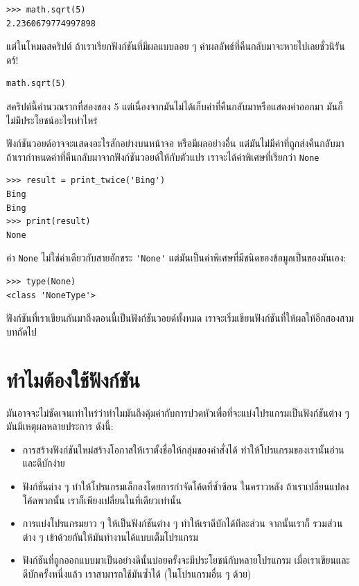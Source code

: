 \begin{verbatim}
>>> math.sqrt(5)
2.2360679774997898
\end{verbatim}
%
แต่ในโหมดสคริปต์ ถ้าเราเรียกฟังก์ชันที่มีผลแบบลอย ๆ ค่าผลลัพธ์ที่คืนกลับมาจะหายไปเลยชั่วนิรันดร์!

\begin{verbatim}
math.sqrt(5)
\end{verbatim}
% 
สคริปต์นี้คำนวณรากที่สองของ 5 แต่เนื่องจากมันไม่ได้เก็บค่าที่คืนกลับมาหรือแสดงค่าออกมา มันก็ไม่มีประโยชน์อะไรเท่าไหร่

ฟังก์ชันวอยด์อาจจะแสดงอะไรสักอย่างบนหน้าจอ หรือมีผลอย่างอื่น แต่มันไม่มีค่าที่ถูกส่งคืนกลับมา
ถ้าเรากำหนดค่าที่คืนกลับมาจากฟังก์ชันวอยด์ให้กับตัวแปร เราจะได้ค่าพิเศษที่เรียกว่า {\tt None}

\begin{verbatim}
>>> result = print_twice('Bing')
Bing
Bing
>>> print(result)
None
\end{verbatim}
%
ค่า {\tt None} ไม่ใช่ค่าเดียวกับสายอักขระ \verb"'None'" แต่มันเป็นค่าพิเศษที่มีชนิดของข้อมูลเป็นของมันเอง:

\begin{verbatim}
>>> type(None)
<class 'NoneType'>
\end{verbatim}
%
ฟังก์ชันที่เราเขียนกันมาถึงตอนนี้เป็นฟังก์ชันวอยด์ทั้งหมด เราจะเริ่มเขียนฟังก์ชันที่ให้ผลให้อีกสองสามบทถัดไป


\section{ทำไมต้องใช้ฟังก์ชัน} %

มันอาจจะไม่ชัดเจนเท่าไหร่ว่าทำไมมันถึงคุ้มค่ากับการปวดหัวเพื่อที่จะแบ่งโปรแกรมเป็นฟังก์ชันต่าง ๆ
มันมีเหตุผลหลายประการ ดังนี้:

\begin{itemize}

\item การสร้างฟังก์ชันใหม่สร้างโอกาสให้เราตั้งชื่อให้กลุ่มของคำสั่งได้ ทำให้โปรแกรมของเรานั้นอ่านและดีบักง่าย

\item ฟังก์ชันต่าง ๆ ทำให้โปรแกรมเล็กลงโดยการกำจัดโค้ดที่ซ้ำซ้อน  ในคราวหลัง ถ้าเราเปลี่ยนแปลงโค้ดพวกนั้น 
เราก็เพียงเปลี่ยนในที่เดียวเท่านั้น

\item การแบ่งโปรแกรมยาว ๆ ให้เป็นฟังก์ชันต่าง ๆ ทำให้เราดีบักได้ทีละส่วน จากนั้นเราก็
รวมส่วนต่าง ๆ เข้าด้วยกันให้มันทำงานได้แบบเต็มโปรแกรม

\item ฟังก์ชันที่ถูกออกแบบมาเป็นอย่างดีนั้นบ่อยครั้งจะมีประโยชน์กับหลายโปรแกรม เมื่อเราเขียนและดีบักครั้งหนึ่งแล้ว
เราสามารถใช้มันซ้ำได้ (ในโปรแกรมอื่น ๆ ด้วย)

\end{itemize}


